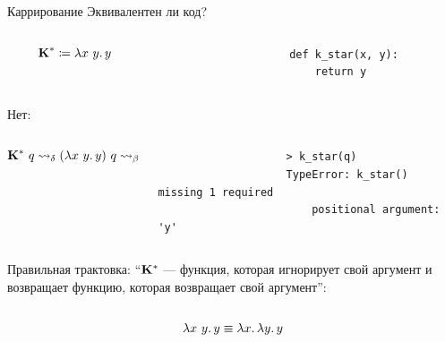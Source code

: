     \begin{frame}[fragile]{Каррирование}
        \vspace{-0.5em}
        Эквивалентен ли код?
        \vspace{-1em}
        \begin{columns}[onlytextwidth]
            \begin{column}[t]{0.485\textwidth}
                \vspace{0.2 em}
                \[\textbf{K}^* \coloneqq \lambda x~y\ldotp y\]
            \end{column}\hfill%
            \begin{column}[t]{0.485\textwidth}
                \begin{verbatim}
                    def k_star(x, y):
                        return y
                \end{verbatim}
            \end{column}
        \end{columns}
        \pause
        Нет:
        \vspace{-2em}
        \begin{columns}[onlytextwidth]
            \begin{column}[t]{0.485\textwidth}
                \vspace{0.5em}
                \[\mathbf{K}^* ~ q \rightsquigarrow_\delta (\lambda x~y\ldotp y) ~ q \rightsquigarrow_\beta \lambda y\ldotp y \]
            \end{column}\hfill%
            \begin{column}[t]{0.485\textwidth}
                \begin{verbatim}
                    > k_star(q)
                    TypeError: k_star() missing 1 required
                        positional argument: 'y'
                \end{verbatim}
            \end{column}
        \end{columns}
        \pause
        \vspace{0.3em}
        Правильная трактовка: ``$\mathbf{K}^*$ --- функция, которая игнорирует свой аргумент и возвращает
        функцию, которая возвращает свой аргумент'':
        \vspace{-1.5em}
        \begin{columns}[onlytextwidth]
            \begin{column}[t]{0.485\textwidth}
                \vspace{0.5em}
                \[\lambda x~y\ldotp y \equiv \lambda x\ldotp \lambda y\ldotp y\]

\end{column}
\end{columns}
\end{frame}
